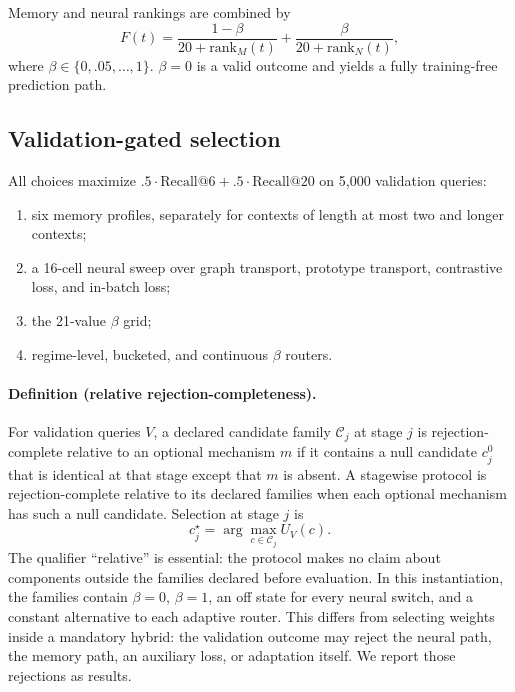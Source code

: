 \documentclass[runningheads]{llncs}
\begin{document}
Memory and neural rankings are combined by
\begin{equation}
F(t)=\frac{1-\beta}{20+\mathrm{rank}_M(t)}+\frac{\beta}{20+\mathrm{rank}_N(t)},
\end{equation}
where $\beta\in\{0,.05,\ldots,1\}$. $\beta=0$ is a valid outcome and yields a
fully training-free prediction path.

\subsection{Validation-gated selection}
All choices maximize $.5\cdot\mathrm{Recall}@6+.5\cdot\mathrm{Recall}@20$ on
5,000 validation queries:
\begin{enumerate}
\item six memory profiles, separately for contexts of length at most two and
      longer contexts;
\item a 16-cell neural sweep over graph transport, prototype transport,
      contrastive loss, and in-batch loss;
\item the 21-value $\beta$ grid;
\item regime-level, bucketed, and continuous $\beta$ routers.
\end{enumerate}

\paragraph{Definition (relative rejection-completeness).}
For validation queries $V$, a declared candidate family $\mathcal{C}_j$ at
stage $j$ is rejection-complete relative to an optional mechanism $m$ if it
contains a null candidate $c_j^0$ that is identical at that stage except that
$m$ is absent. A stagewise protocol is rejection-complete relative to its
declared families when each optional mechanism has such a null candidate.
Selection at stage $j$ is
\begin{equation}
c_j^\star=\arg\max_{c\in\mathcal{C}_j} U_V(c).
\end{equation}
The qualifier ``relative'' is essential: the protocol makes no claim about
components outside the families declared before evaluation. In this
instantiation, the families contain $\beta=0$,
$\beta=1$, an off state for every neural switch, and a constant alternative to
each adaptive router. This differs from selecting weights inside a mandatory
hybrid: the validation outcome may reject the neural path, the memory path, an
auxiliary loss, or adaptation itself. We report those rejections as results.
\end{document}
